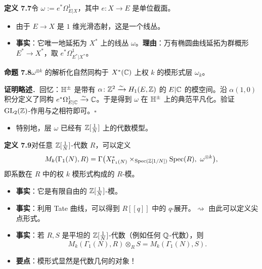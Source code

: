 \noindent\textbf{定义 7.7}\label{def:7.7}\quad 令 $\omega:=e^*\Omega^1_{E|X}$，其中 $e\colon X\to E$ 是单位截面。
\begin{itemize}
\item 由于 $E\to X$ 是 $1$ 维光滑态射，这是一个线丛。
\item \textbf{事实}：它唯一地延拓为 $X^*$ 上的线丛 $\omega$。\textbf{理由}：万有椭圆曲线延拓为群概形 $E^*\to X^*$，取 $e^*\Omega^1_{E^*|X^*}$。
\end{itemize}

\noindent\textbf{命题 7.8}\label{prop:7.8}\quad $\omega^{\otimes k}$ 的解析化自然同构于 $X^*(\mathbb{C})$ 上权 $k$ 的模形式层 $\omega_k$。

\noindent\textbf{证明略述}．回忆：$\mathbb{H}^\pm$ 是带有 $\alpha\colon\mathbb{Z}^2\xrightarrow{\sim}H_1(E,\mathbb{Z})$ 的 $E|\mathbb{C}$ 的模空间。沿 $\alpha(1,0)$ 积分定义了同构 $e^*\Omega^1_{E|\mathbb{C}}\xrightarrow{\sim}\mathbb{C}$。于是得到 $\omega$ 在 $\mathbb{H}^\pm$ 上的典范平凡化。验证 $\operatorname{GL}_2(\mathbb{Z})$-作用与之相符即可。\hfill$\square$

\begin{itemize}
\item 特别地，层 $\omega$ 已经有 $\mathbb{Z}[\frac1N]$ 上的代数模型。
\end{itemize}

\noindent\textbf{定义 7.9}\label{def:7.9}\quad 对任意 $\mathbb{Z}[\frac1N]$-代数 $R$，可以定义
\[
M_k(\Gamma_1(N),R)=\Gamma\bigl(X^*_{\Gamma_1(N)}\times_{\Spec(\Z[1/N])}\Spec(R),\ \omega^{\otimes k}\bigr),
\]
即系数在 $R$ 中的权 $k$ 模形式构成的 $R$-模。
\begin{itemize}
\item \textbf{事实}：它是有限自由的 $\mathbb{Z}[\frac1N]$-模。
\item \textbf{事实}：利用 Tate 曲线，可以得到 $R[[q]]$ 中的 $q$-展开。$\rightsquigarrow$ 由此可以定义尖点形式。
\item \textbf{事实}：若 $R,S$ 是平坦的 $\mathbb{Z}[\frac1N]$-代数（例如任何 $\mathbb{Q}$-代数），则
\[
M_k(\Gamma_1(N),R)\otimes_R S=M_k(\Gamma_1(N),S).
\]
\item \textbf{要点}：模形式显然是代数几何的对象！
\end{itemize}
